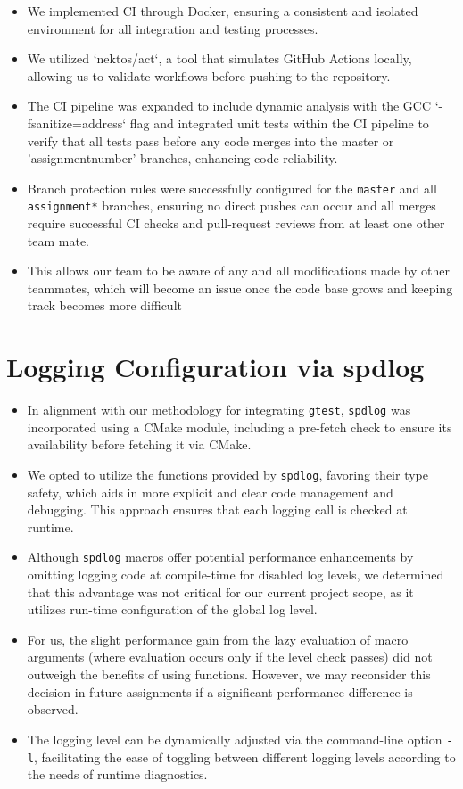\documentclass{article}
\begin{document}
\begin{itemize}
    \item We implemented CI through Docker, ensuring a consistent and isolated environment for all integration and testing processes.
    \item We utilized `nektos/act`, a tool that simulates GitHub Actions locally, allowing us to validate workflows before pushing to the repository.
    \item The CI pipeline was expanded to include dynamic analysis with the GCC `-fsanitize=address` flag and integrated unit tests within the CI pipeline to verify that all tests pass before any code merges into the master or 'assignment{number}' branches, enhancing code reliability.
    \item Branch protection rules were successfully configured for the \verb|master| and all \verb|assignment*| branches, ensuring no direct pushes can occur and all merges require successful CI checks and pull-request reviews from at least one other team mate.
    \item This allows our team to be aware of any and all modifications made by other teammates, which will become an issue once the code base grows and keeping track becomes more difficult
\end{itemize}

\section{Logging Configuration via spdlog}
\label{sec:spd}

\begin{itemize}
    \item In alignment with our methodology for integrating \verb|gtest|, \verb|spdlog| was incorporated using a CMake module, including a pre-fetch check to ensure its availability before fetching it via CMake.
    \item We opted to utilize the functions provided by \verb|spdlog|, favoring their type safety, which aids in more explicit and clear code management and debugging. This approach ensures that each logging call is checked at runtime.
    \item Although \verb|spdlog| macros offer potential performance enhancements by omitting logging code at compile-time for disabled log levels, we determined that this advantage was not critical for our current project scope, as it utilizes run-time configuration of the global log level.
    \item For us, the slight performance gain from the lazy evaluation of macro arguments (where evaluation occurs only if the level check passes) did not outweigh the benefits of using functions. However, we may reconsider this decision in future assignments if a significant performance difference is observed.
    \item The logging level can be dynamically adjusted via the command-line option \texttt{-l}, facilitating the ease of toggling between different logging levels according to the needs of runtime diagnostics.
\end{itemize}
\end{document}
